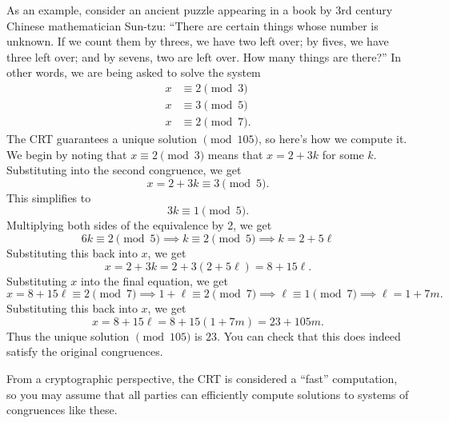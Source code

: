 \documentclass{article}
\theoremstyle{definition}
\theoremstyle{remark}
\begin{document}
        As an example, consider an ancient puzzle appearing in a book by 3rd century Chinese mathematician Sun-tzu:
        ``There are certain things whose number is unknown. 
        If we count them by threes, we have two left over; by fives, we have three left over; and by sevens, two are left over. 
        How many things are there?''
        In other words, we are being asked to solve the system
        \begin{align*}
            x &\equiv 2\pmod{3}\\
            x &\equiv 3\pmod{5}\\
            x &\equiv 2\pmod{7}.
        \end{align*}
        The CRT guarantees a unique solution \(\pmod{105}\), so here's how we compute it.
        We begin by noting that \(x\equiv 2\pmod 3\) means that \(x=2+3k\) for some \(k\).
        Substituting into the second congruence, we get 
        \[x=2+3k\equiv 3\pmod 5.\]
        This simplifies to
        \[3k\equiv 1\pmod 5.\]
        Multiplying both sides of the equivalence by 2, we get
        \[6k\equiv 2\pmod 5\implies k\equiv 2\pmod 5\implies k=2 + 5\ell\]
        Substituting this back into \(x\), we get 
        \[x = 2 + 3k = 2 + 3(2+5\ell) = 8 + 15\ell.\]
        Substituting \(x\) into the final equation, we get
        \[x = 8+15\ell\equiv 2\pmod 7\implies 1+\ell\equiv 2\pmod 7\implies \ell\equiv 1\pmod 7\implies \ell = 1+7m.\]
        Substituting this back into \(x\), we get
        \[x = 8 + 15\ell = 8 + 15(1+7m) = 23 + 105m.\]
        Thus the unique solution \(\pmod{105}\) is \(23\). 
        You can check that this does indeed satisfy the original congruences.

        From a cryptographic perspective, the CRT is considered a ``fast'' computation, so you may assume that all parties can efficiently compute solutions to systems of congruences like these.
\end{document}
